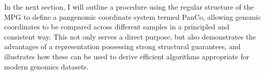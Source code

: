 In the next section, I will outline a procedure using the regular structure of the MPG to define a pangenomic coordinate system termed PanCo, allowing genomic coordinates to be compared across different samples in a principled and consistent way. %
This not only serves a direct purpose, but also demonstrates the advantages of a representation possessing strong structural guarantees, and illustrates how these can be used to derive efficient algorithms appropriate for modern genomics datasets.




%
%

